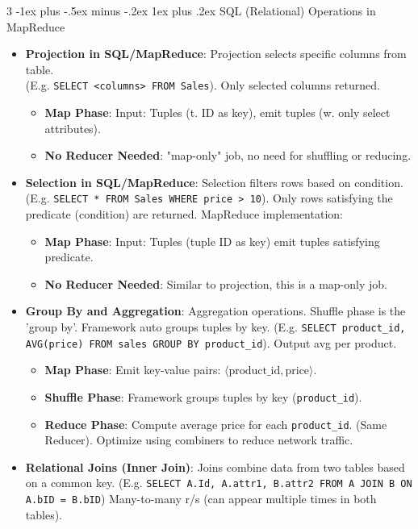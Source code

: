 \documentclass[a4paper, 9pt, landscape]{article}
\makeatletter
\renewcommand{\subsubsection}{\@startsection{subsubsection}{3}{0mm}%
                                {-1ex plus -.5ex minus -.2ex}%
                                {1ex plus .2ex}%
                                {\normalfont\small\bfseries}}
\makeatother
\begin{document}
\begin{multicols*}{3}
\subsubsection{SQL (Relational) Operations in MapReduce}
\begin{itemize}[itemsep = 0.5pt]
\item \textbf{Projection in SQL/MapReduce}: Projection selects specific columns from table. \\
 (E.g. \texttt{SELECT <columns> FROM Sales}). Only selected columns returned.
	\begin{itemize}
	\item \textbf{Map Phase}: Input: Tuples (t. ID as key), emit tuples (w. only select attributes).
	\item \textbf{No Reducer Needed}: "map-only" job, no need for shuffling or reducing.
	\end{itemize}
\item \textbf{Selection in SQL/MapReduce}: Selection filters rows based on condition. (E.g.  \texttt{SELECT * FROM Sales WHERE price > 10}). Only rows satisfying the predicate (condition) are returned.  MapReduce implementation:
	\begin{itemize}
	\item \textbf{Map Phase}: Input: Tuples (tuple ID as key) emit tuples satisfying predicate.
	\item \textbf{No Reducer Needed}: Similar to projection, this is a map-only job.
	\end{itemize}
\item \textbf{Group By and Aggregation}: Aggregation operations. Shuffle phase is the 'group by'. Framework auto groups tuples by key.
(E.g. \texttt{SELECT product\_id, AVG(price) FROM sales GROUP BY product\_id}). Output avg per product.
	\begin{itemize}
	\item \textbf{Map Phase}: Emit key-value pairs: $\langle \text{product\_id}, \text{price} \rangle$.
	\item \textbf{Shuffle Phase}: Framework groups tuples by key (\texttt{product\_id}).
    \item \textbf{Reduce Phase}: Compute average price for each \texttt{product\_id}. (Same Reducer). Optimize using combiners to reduce network traffic.
	\end{itemize}
\item \textbf{Relational Joins (Inner Join)}: Joins combine data from two tables based on a common key. (E.g. \texttt{SELECT A.Id, A.attr1, B.attr2 FROM A JOIN B ON A.bID = B.bID}) Many-to-many r/s (can appear multiple times in both tables).  

\end{itemize}
\end{multicols*}
\end{document}
